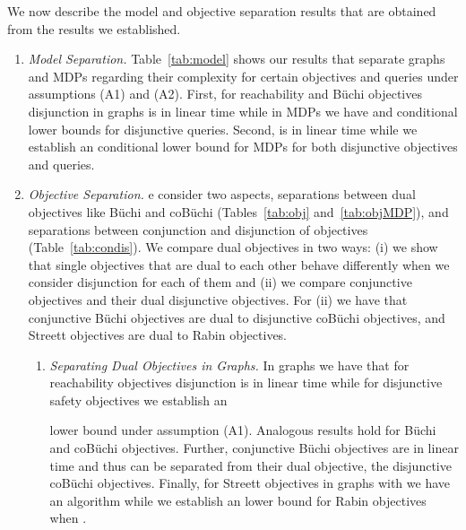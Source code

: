 \documentclass[11pt,letterpaper]{article}
\newif\iffullversion
\newcommand{\infull}[1]{\iffullversion #1\fi}
\newcommand{\inshort}[1]{\iffullversion \else #1\fi}
\begin{document}
\smallskip{} 
We now describe the model and objective separation results that are obtained 
from the results we established.
\begin{enumerate}
\item
\emph{Model Separation.} 
    Table~\ref{tab:model} shows our results that 
    separate graphs and MDPs regarding their complexity for certain 
    objectives and queries under assumptions (A1) and (A2).
    First, 
    for reachability and Büchi objectives disjunction in graphs is in linear time 
    while in MDPs we have  and  conditional 
    lower bounds for disjunctive queries. 
    Second, \infull{for coBüchi we have a separation when restricted to the 
    class where each target set is a singleton. 
    For these objectives disjunction in graphs} 
    is in linear time while 
    we establish an  conditional lower bound for MDPs for both 
    disjunctive objectives and queries.
    
\item
\emph{Objective Separation.}
    \infull{Further we identify complexity separations between different objectives. 
    Here w}e consider two aspects, separations between dual objectives like Büchi and 
    coBüchi (Tables~\ref{tab:obj} and~\ref{tab:objMDP}), and separations between 
    conjunction and disjunction of objectives (Table~\ref{tab:condis}).
    We compare dual objectives in two ways: (i) we show that single objectives
    that are dual to each other behave differently when we consider 
    disjunction for each of them and (ii) we compare conjunctive objectives
    and their dual disjunctive objectives. For (ii) we have that 
    conjunctive Büchi objectives are dual to disjunctive coBüchi objectives,
    and Streett objectives\infull{, the conjunction of 1-pair Streett objectives,} are 
    dual to Rabin objectives\infull{, the disjunction of 1-pair Rabin objectives}.
    
    \begin{enumerate}
\item
\emph{Separating Dual Objectives in Graphs.}
		\infull{First, we consider reachability and safety objectives. }In graphs we have 
		that for reachability objectives disjunction
		is in linear time while for disjunctive safety objectives we establish an 
		 
		lower bound under assumption (A1). \inshort{Analogous results hold for Büchi and coBüchi objectives.}\infull{Analogously, we have 
		disjunctive Büchi objectives are in linear time on graphs
		while we establish an  conditional lower bound for disjunction of coBüchi objectives.}
		Further, conjunctive Büchi objectives are in linear time and thus can 
		be separated from their dual objective, the disjunctive coBüchi objectives.
		Finally, for Streett objectives in graphs with  
		we have an  algorithm while we establish an 
		 lower bound for Rabin objectives when .
		

\end{enumerate}
\end{enumerate}
\end{document}
